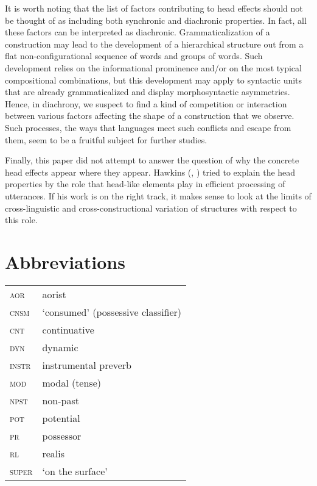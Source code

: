 \documentclass[output=paper,nobabel,draftmode  ,colorlinks, citecolor=brown]{langscibook}
\begin{document}
It is worth noting that the list of factors contributing to head effects should not be thought of as
including both synchronic and diachronic properties. In fact, all these factors can be interpreted
as diachronic. Grammaticalization of a construction may lead to the development of a hierarchical
structure out from a flat non-configurational sequence of words and groups of words. Such
development relies on the informational prominence and/or on the most typical compositional
combinations, but this development may apply to syntactic units that are already grammaticalized and
display morphosyntactic asymmetries. Hence, in diachrony, we suspect to find a kind of competition
or interaction between various factors affecting the shape of a construction that we observe. Such
processes, the ways that languages meet such conflicts and escape from them, seem to be a fruitful
subject for further studies.

Finally, this paper did not attempt to answer the question of why the concrete head effects appear where they appear. Hawkins (\citeyear{Hawkins1993}, \citeyear[343--358]{Hawkins1995}) tried to explain the head properties by the role that head-like elements play in efficient processing of utterances. If his work is on the right track, it makes sense to look at the limits of cross-linguistic and cross-constructional variation of structures with respect to this role. 

\section*{Abbreviations}

\begin{tabularx}{.99\textwidth}{@{}lX}
\textsc{aor}	& aorist\\
\textsc{cnsm}	& `consumed' (possessive classifier)\\
\textsc{cnt}	& continuative\\
\textsc{dyn}	& dynamic\\
\textsc{instr}	& instrumental preverb\\
\textsc{mod}	& modal (tense)\\
\textsc{npst}	& non-past\\
\textsc{pot}	& potential\\
\textsc{pr}	& possessor\\
\textsc{rl}	& realis\\
\textsc{super}	& `on the surface'\\
\end{tabularx}
\end{document}

